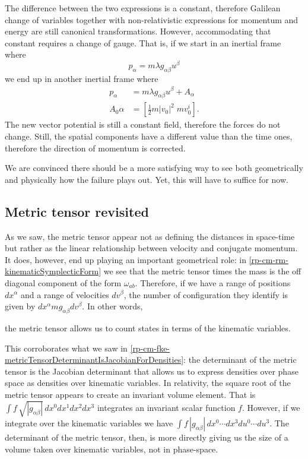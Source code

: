 The difference between the two expressions is a constant, therefore Galilean change of variables together with non-relativistic expressions for momentum and energy are still canonical transformations. However, accommodating that constant requires a change of gauge. That is, if we start in an inertial frame where
\begin{equation}
	p_{\alpha} = m \lambda g_{\alpha\beta} u^{\beta}
\end{equation}
we end up in another inertial frame where
\begin{equation}
	\begin{aligned}
	p_{\alpha} &= m \lambda g_{\alpha\beta} u^{\beta} + A_\alpha \\
	A_0\alpha &= \left[\frac{1}{2} m|v_0|^2 \; mv_0^i\right].
	\end{aligned}
\end{equation}
The new vector potential is still a constant field, therefore the forces do not change. Still, the spatial components have a different value than the time ones, therefore the direction of momentum is corrected.

We are convinced there should be a more satisfying way to see both geometrically and physically how the failure plays out. Yet, this will have to suffice for now.

\subsection{Metric tensor revisited}

As we saw, the metric tensor appear not as defining the distances in space-time but rather as the linear relationship between velocity and conjugate momentum. It does, however, end up playing an important geometrical role: in \ref{rp-cm-rm-kinematicSymplecticForm} we see that the metric tensor times the mass is the off diagonal component of the form $\omega_{ab}$. Therefore, if we have a range of positions $dx^\alpha$ and a range of velocities $dv^\beta$, the number of configuration they identify is given by $dx^\alpha m g_{\alpha\beta} dv^\beta$. In other words,
\begin{insight}
	the metric tensor allows us to count states in terms of the kinematic variables.
\end{insight}

This corroborates what we saw in \ref{rp-cm-fke-metricTensorDeterminantIsJacobianForDensities}: the determinant of the metric tensor is the Jacobian determinant that allows us to express densities over phase space as densities over kinematic variables. In relativity, the square root of the metric tensor appears to create an invariant volume element. That is $\int f \, \sqrt{|g_{\alpha\beta}|} \, dx^0 dx^1 dx^2 dx^3$ integrates an invariant scalar function $f$. However, if we integrate over the kinematic variables we have $\int f \, |g_{\alpha\beta}| \, dx^0 \cdots dx^3 du^0 \cdots du^3$. The determinant of the metric tensor, then, is more directly giving us the size of a volume taken over kinematic variables, not in phase-space.

